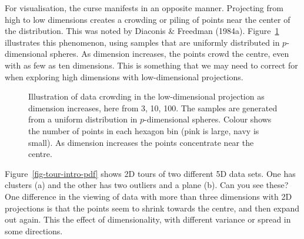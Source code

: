 \documentclass[
  letterpaper,
]{krantz}
\begin{document}

For visualisation, the curse manifests in an opposite manner. Projecting
from high to low dimensions creates a crowding or piling of points near
the center of the distribution. This was noted by Diaconis \& Freedman
(1984a). Figure~\ref{fig-density} illustrates this phenomenon, using
samples that are uniformly distributed in \(p\)-dimensional spheres. As
dimension increases, the points crowd the centre, even with as few as
ten dimensions. This is something that we may need to correct for when
exploring high dimensions with low-dimensional projections.


\begin{figure}


\caption{\label{fig-density}Illustration of data crowding in the
low-dimensional projection as dimension increases, here from 3, 10, 100.
The samples are generated from a uniform distribution in
\(p\)-dimensional spheres. Colour shows the number of points in each
hexagon bin (pink is large, navy is small). As dimension increases the
points concentrate near the centre.}

\end{figure}%

Figure~\ref{fig-tour-intro-pdf} shows 2D tours of two different 5D data
sets. One has clusters (a) and the other has two outliers and a plane
(b). Can you see these? One difference in the viewing of data with more
than three dimensions with 2D projections is that the points seem to
shrink towards the centre, and then expand out again. This the effect of
dimensionality, with different variance or spread in some directions.
\end{document}
